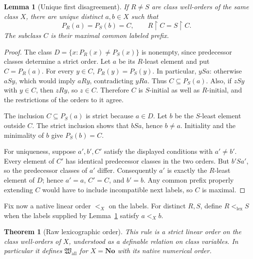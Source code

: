 \documentclass[11pt]{article}
\newtheorem{theorem}{Theorem}[section]
\newtheorem{lemma}[lemma]{Lemma}
\theoremstyle{definition}
\theoremstyle{remark}
\newcommand{\No}{\mathbf{No}}
\newcommand{\Hall}{\mathfrak W_{\mathrm{all}}}
\newcommand{\lex}{\mathrm{lex}}
\begin{document}
\begin{lemma}[Unique first disagreement]
\label{swo:cf:first}
If \(R\ne S\) are class well-orders of the same class \(X\), there are
unique distinct \(a,b\in X\) such that
\[
 P_R(a)=P_S(b)=C,
 \qquad R\mathbin{\upharpoonright}C=S\mathbin{\upharpoonright}C.
\]
The subclass \(C\) is their maximal common labeled prefix.
\end{lemma}

\begin{proof}
The class \(D=\{x:P_R(x)\ne P_S(x)\}\) is nonempty, since predecessor
classes determine a strict order.  Let \(a\) be its \(R\)-least element
and put \(C=P_R(a)\).  For every \(y\in C\),
\(P_R(y)=P_S(y)\).  In particular, \(ySa\): otherwise \(aSy\), which
would imply \(aRy\), contradicting \(yRa\).  Thus \(C\subseteq P_S(a)\).
Also, if \(zSy\) with \(y\in C\), then \(zRy\), so \(z\in C\).
Therefore \(C\) is \(S\)-initial as well as \(R\)-initial, and the
restrictions of the orders to it agree.

The inclusion \(C\subseteq P_S(a)\) is strict because \(a\in D\).
Let \(b\) be the \(S\)-least element outside \(C\).  The strict
inclusion shows that \(bSa\), hence \(b\ne a\).  Initiality and the
minimality of \(b\) give \(P_S(b)=C\).

For uniqueness, suppose \(a',b',C'\) satisfy the displayed conditions with
\(a'\ne b'\).  Every element of \(C'\) has identical predecessor
classes in the two orders.  But \(b'Sa'\), so the predecessor classes of
\(a'\) differ.  Consequently \(a'\) is exactly the \(R\)-least element
of \(D\); hence \(a'=a\), \(C'=C\), and \(b'=b\).  Any common
prefix properly extending \(C\) would have to include incompatible next
labels, so \(C\) is maximal.
\end{proof}

Fix now a native linear order \(<_X\) on the labels.  For distinct \(R,S\),
define \(R<_{\lex}S\) when the labels supplied by
Lemma~\ref{swo:cf:first} satisfy \(a<_Xb\).

\begin{theorem}[Raw lexicographic order]
\label{swo:cf:lex}
This rule is a strict linear order on the class well-orders of \(X\),
understood as a definable relation on class variables.  In particular it
defines \(\Hall\) for \(X=\No\) with its native numerical order.
\end{theorem}
\end{document}
